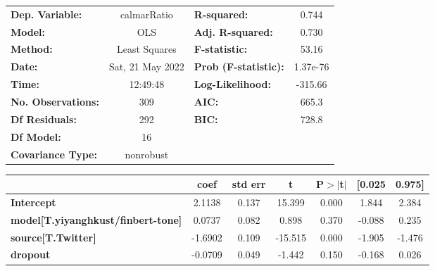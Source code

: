 \begin{center}
\begin{tabular}{lclc}
\toprule
\textbf{Dep. Variable:}                    &   calmarRatio    & \textbf{  R-squared:         } &     0.744   \\
\textbf{Model:}                            &       OLS        & \textbf{  Adj. R-squared:    } &     0.730   \\
\textbf{Method:}                           &  Least Squares   & \textbf{  F-statistic:       } &     53.16   \\
\textbf{Date:}                             & Sat, 21 May 2022 & \textbf{  Prob (F-statistic):} &  1.37e-76   \\
\textbf{Time:}                             &     12:49:48     & \textbf{  Log-Likelihood:    } &   -315.66   \\
\textbf{No. Observations:}                 &         309      & \textbf{  AIC:               } &     665.3   \\
\textbf{Df Residuals:}                     &         292      & \textbf{  BIC:               } &     728.8   \\
\textbf{Df Model:}                         &          16      & \textbf{                     } &             \\
\textbf{Covariance Type:}                  &    nonrobust     & \textbf{                     } &             \\
\bottomrule
\end{tabular}
\begin{tabular}{lcccccc}
                                           & \textbf{coef} & \textbf{std err} & \textbf{t} & \textbf{P$> |$t$|$} & \textbf{[0.025} & \textbf{0.975]}  \\
\midrule
\textbf{Intercept}                         &       2.1138  &        0.137     &    15.399  &         0.000        &        1.844    &        2.384     \\
\textbf{model[T.yiyanghkust/finbert-tone]} &       0.0737  &        0.082     &     0.898  &         0.370        &       -0.088    &        0.235     \\
\textbf{source[T.Twitter]}                 &      -1.6902  &        0.109     &   -15.515  &         0.000        &       -1.905    &       -1.476     \\
\textbf{dropout}                           &      -0.0709  &        0.049     &    -1.442  &         0.150        &       -0.168    &        0.026     \\

\end{tabular}
\end{center}
